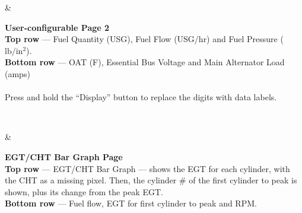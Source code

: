 \begin{longtable}
\begin{minipage}{\eistableleftcol}
\end{minipage}&
\begin{minipage}{\eistablerightcol}
\vspace{\tabletopspace}
\textbf{User-configurable Page 2}\\
\textbf{Top row} --- Fuel Quantity (USG), Fuel Flow (USG/hr) and Fuel Pressure ($\mathrm{lb/in^{2}}$).\\
\textbf{Bottom row} --- OAT (\textdegree F), Essential Bus Voltage and Main Alternator Load (amps)\\\\
Press and hold the ``Display'' button to replace the digits with data labels.
\vspace{\tablebottomspace}
\end{minipage}\\
\hline

\begin{minipage}{\eistableleftcol}
\setlength{\unitlength}{1.31pt}
\end{minipage}&
\begin{minipage}{\eistablerightcol}
\vspace{\tabletopspace}
\textbf{EGT/CHT Bar Graph Page}\\
\textbf{Top row} --- EGT/CHT Bar Graph --- shows the EGT for each cylinder, with the CHT as a missing pixel.  
Then, the cylinder \# of the first cylinder to peak is shown, plus its change from the peak EGT. \\
\textbf{Bottom row} --- Fuel flow, EGT for first cylinder to peak and RPM.
\vspace{\tablebottomspace}
\end{minipage}\\
\hline


\end{longtable}
